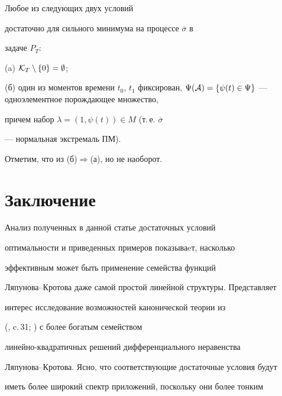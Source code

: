 \begin{cor}


Любое из следующих двух условий


достаточно для сильного минимума на процессе $\overline{\sigma}$ в


задаче $P_T$:





(a) ${\cal K}_T \setminus \{0\}=\emptyset$;





(б) один из моментов времени $t_0 $, $t_1 $ фиксирован, $\Psi ({\cal


A})=\{\psi (t)\in \Psi \}$ --- одноэлементное порождающее множество,


причем набор $\lambda =(1, \psi (t))\in M$ (т.\,е. $\overline{\sigma}$


--- нормальная экстремаль ПМ).


\end{cor}





Отметим, что из (б)\;$\Rightarrow$\;(а), но не наоборот.








\section{Заключение}





Анализ полученных в данной статье достаточных условий


оптимальности и приведенных примеров показываeт, насколько


эффективным может быть применение семейства функций


Ляпунова--Кротова даже самой простой линейной структуры. Представляет


интерес исследование возможностей канонической теории из


(\cite{10}, c.\,31; \cite{11}) с более богатым семейством


линейно-квадратичных решений дифференциального неравенства


Ляпунова--Кротова. Ясно, что соответствующие достаточные условия будут


иметь более широкий спектр приложений, поскольку они более тонким


